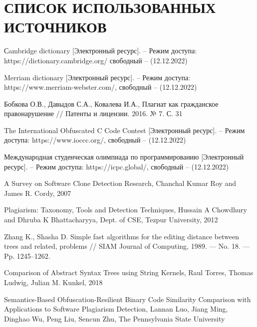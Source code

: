 \section*{СПИСОК ИСПОЛЬЗОВАННЫХ ИСТОЧНИКОВ}

\begingroup
\renewcommand{\section}[2]{}
\begin{thebibliography}{}
	
	
	Сambridge dictionary  [Электронный ресурс]. -- Режим доступа: 
	https://dictionary.cambridge.org/
	свободный -- (12.12.2022)
	
	Merriam dictionary [Электронный ресурс]. -- Режим доступа: 
	https://www.merriam-webster.com/,
	свободный -- (12.12.2022)
	
	Бобкова О.В., Давыдов С.А., Ковалева И.А., 
	Плагиат как гражданское правонарушение //
	Патенты и лицензии. 2016. № 7. С. 31
	
	
	The International Obfuscated C Code Contest  [Электронный ресурс]. -- Режим доступа: 
	https://www.ioccc.org/,
	свободный -- (12.12.2022)
	
	
	Международная студенческая олимпиада по программированию [Электронный ресурс]. -- Режим доступа: 
	https://icpc.global/,
	свободный -- (12.12.2022)
	
	A Survey on Software Clone Detection Research,
	Chanchal Kumar Roy and James R. Cordy,
	2007
	
	Plagiarism: Taxonomy, Tools and Detection Techniques,
	Hussain A Chowdhury and Dhruba K Bhattacharyya,
	Dept. of CSE, Tezpur University,
	2012
	
	Zhang K., Shasha D. Simple fast algorithms for the editing distance between trees and related,
	problems // SIAM Journal of Computing, 1989. — No. 18. — Pp. 1245–1262.
	
	Comparison of Abstract Syntax Trees using String Kernels,
	Raul Torres, Thomas Ludwig, Julian M. Kunkel,
	2018

	Semantics-Based Obfuscation-Resilient Binary Code
	Similarity Comparison with Applications to Software
	Plagiarism Detection,
	Lannan Luo, Jiang Ming, Dinghao Wu, Peng Liu, Sencun Zhu,
	The Pennsylvania State University
	
	
\end{thebibliography}
\endgroup

\pagebreak